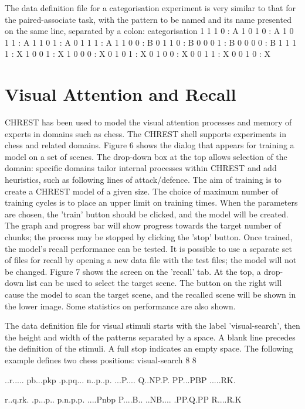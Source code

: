 \documentclass{article}
\begin{document}
The data definition file for a categorisation experiment is very similar to that for the paired-associate task, with the pattern to be named and its name presented on the same line, separated by a colon:
categorisation 
1 1 1 0 : A 
1 0 1 0 : A 
1 0 1 1 : A 
1 1 0 1 : A 
0 1 1 1 : A 
1 1 0 0 : B 
0 1 1 0 : B 
0 0 0 1 : B 
0 0 0 0 : B 
1 1 1 1 : X 
1 0 0 1 : X 
1 0 0 0 : X 
0 1 0 1 : X 
0 1 0 0 : X 
0 0 1 1 : X 
0 0 1 0 : X 

\section{Visual Attention and Recall}

CHREST has been used to model the visual attention processes and memory of experts in domains such as chess.  The CHREST shell supports experiments in chess and related domains. 
Figure 6 shows the dialog that appears for training a model on a set of scenes.  The drop-down box at the top allows selection of the domain: specific domains tailor internal processes within CHREST and add heuristics, such as following lines of attack/defence.  The aim of training is to create a CHREST model of a given size.  The choice of maximum number of training cycles is to place an upper limit on training times.  When the parameters are chosen, the 'train' button should be clicked, and the model will be created.  The graph and progress bar will show progress towards the target number of chunks; the process may be stopped by clicking the 'stop' button.
Once trained, the model's recall performance can be tested.  It is possible to use a separate set of files for recall by opening a new data file with the test files; the model will not be changed.  Figure 7 shows the screen on the 'recall' tab.  At the top, a drop-down list can be used to select the target scene.  The button on the right will cause the model to scan the target scene, and the recalled scene will be shown in the lower image.  Some statistics on performance are also shown.

The data definition file for visual stimuli starts with the label 'visual-search', then the height and width of the patterns separated by a space.  A blank line precedes the definition of the stimuli.  A full stop indicates an empty space.  The following example defines two chess positions:
visual-search
8 8

..r.....
pb...pkp
.p.pq...
n..p..p.
...P....
Q..NP.P.
PP...PBP
.....RK.

r..q.rk.
.p...p..
p.n.p.p.
....Pnbp
P....B..
..NB....
.PP.Q.PP
R....R.K
\end{document}
